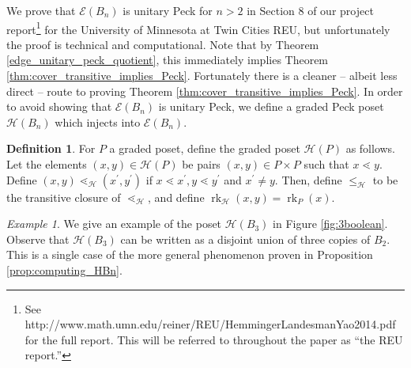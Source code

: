 \documentclass[smallextended, envcountsame, numbook]{svjour3}
\theoremstyle{plain}
\theoremstyle{definition}
\newtheorem{defn}[thm]{Definition}
\theoremstyle{remark}
\newtheorem{eg}[thm]{Example}
\numberwithin{equation}{section}
\newcommand\rk{\operatorname{rk}}
\begin{document}
We prove that $\mathcal E(B_n)$ is unitary Peck for $n > 2$ in Section 8 of our project report\footnote{See http://www.math.umn.edu/reiner/REU/HemmingerLandesmanYao2014.pdf for the full report. This will be referred to throughout the paper as ``the REU report.''} for the University of Minnesota at Twin Cities REU, but unfortunately the proof is technical and computational. Note that by Theorem \ref{edge_unitary_peck_quotient}, this immediately implies Theorem \ref{thm:cover_transitive_implies_Peck}. Fortunately there is a cleaner -- albeit less direct -- route to proving Theorem \ref{thm:cover_transitive_implies_Peck}. In order to avoid showing that $\mathcal E(B_n)$ is unitary Peck, we define a graded Peck poset $\mathcal{H}(B_n)$ which injects into $\mathcal E(B_n)$. 
\begin{defn}
\label{defn:h_map}
For $P$ a graded poset, define the graded poset $\mathcal H(P)$ as follows.  Let the elements $(x, y) \in \mathcal H(P)$ be pairs $(x,y) \in P\times P$ such that $x \lessdot y$.  Define $(x, y) \lessdot_{\mathcal H} (x^\prime, y^\prime)$ if $x \lessdot x^\prime,y\lessdot y^\prime$ and $x^\prime \neq y$.  Then, define $\leq_{\mathcal H}$ to be the transitive closure of $\lessdot_{\mathcal H}$, and define $\rk_{\mathcal H}(x, y) = \rk_P(x)$.
\end{defn}


\begin{eg}
\label{eg:3boolean}
We give an example of the poset $\mathcal H(B_3)$ in Figure \ref{fig:3boolean}. Observe that $\mathcal H(B_3)$ can be written as a disjoint union of three copies of $B_2$. This is a single case of the more general phenomenon proven in Proposition \ref{prop:computing_HBn}.
\end{eg}
\end{document}
